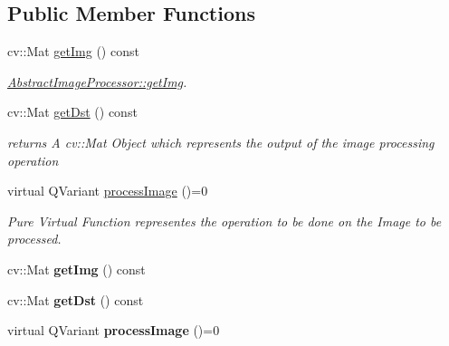 \subsection*{Public Member Functions}
\begin{DoxyCompactItemize}
\item 
cv\+::\+Mat \hyperlink{class_image_processor_1_1_abstract_image_processor_a904d1619b2c6be2c5382469325ca43e3}{get\+Img} () const
\begin{DoxyCompactList}\small\item\em \hyperlink{class_image_processor_1_1_abstract_image_processor_a904d1619b2c6be2c5382469325ca43e3}{Abstract\+Image\+Processor\+::get\+Img}. \end{DoxyCompactList}\item 
cv\+::\+Mat \hyperlink{class_image_processor_1_1_abstract_image_processor_acbf98498ebece7b9f339222097a3429a}{get\+Dst} () const
\begin{DoxyCompactList}\small\item\em returns A cv\+::\+Mat Object which represents the output of the image processing operation \end{DoxyCompactList}\item 
virtual Q\+Variant \hyperlink{class_image_processor_1_1_abstract_image_processor_ad033ae911918b0f6842b7b1d6cdd2b90}{process\+Image} ()=0
\begin{DoxyCompactList}\small\item\em Pure Virtual Function representes the operation to be done on the Image to be processed. \end{DoxyCompactList}\item 
\mbox{\label{class_image_processor_1_1_abstract_image_processor_a767ac703d0d95f54ac3cfc1fe223f6b1}} 
cv\+::\+Mat {\bfseries get\+Img} () const
\item 
\mbox{\label{class_image_processor_1_1_abstract_image_processor_aca36f6820247320a27d5ba8ee923a57e}} 
cv\+::\+Mat {\bfseries get\+Dst} () const
\item 
\mbox{\label{class_image_processor_1_1_abstract_image_processor_aefc5e0bf8333b94feca18d2b6458d3ab}} 
virtual Q\+Variant {\bfseries process\+Image} ()=0
\end{DoxyCompactItemize}
